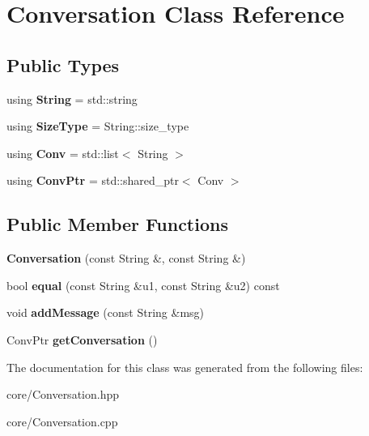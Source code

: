 \hypertarget{classConversation}{}\section{Conversation Class Reference}
\label{classConversation}
\subsection*{Public Types}
\begin{DoxyCompactItemize}
\item 
using {\bfseries String} = std\+::string\hypertarget{classConversation_a2b431b2bafb50e15aec52141053a5d2b}{}\label{classConversation_a2b431b2bafb50e15aec52141053a5d2b}

\item 
using {\bfseries Size\+Type} = String\+::size\+\_\+type\hypertarget{classConversation_a736667fdf70fd1ed56e990a53ffb2e5e}{}\label{classConversation_a736667fdf70fd1ed56e990a53ffb2e5e}

\item 
using {\bfseries Conv} = std\+::list$<$ String $>$\hypertarget{classConversation_ad0d8c118486f9b7bbd1099ededd6ea7f}{}\label{classConversation_ad0d8c118486f9b7bbd1099ededd6ea7f}

\item 
using {\bfseries Conv\+Ptr} = std\+::shared\+\_\+ptr$<$ Conv $>$\hypertarget{classConversation_a3fc3feaa732bef68eb5f504ae3b79a62}{}\label{classConversation_a3fc3feaa732bef68eb5f504ae3b79a62}

\end{DoxyCompactItemize}
\subsection*{Public Member Functions}
\begin{DoxyCompactItemize}
\item 
{\bfseries Conversation} (const String \&, const String \&)\hypertarget{classConversation_ad464ef676935998f598ac83d6dfc5259}{}\label{classConversation_ad464ef676935998f598ac83d6dfc5259}

\item 
bool {\bfseries equal} (const String \&u1, const String \&u2) const \hypertarget{classConversation_a729fc80b6ac75c1cac223a3d1a3c4743}{}\label{classConversation_a729fc80b6ac75c1cac223a3d1a3c4743}

\item 
void {\bfseries add\+Message} (const String \&msg)\hypertarget{classConversation_a5fc239d548391b6c582ac9b2d8c2893b}{}\label{classConversation_a5fc239d548391b6c582ac9b2d8c2893b}

\item 
Conv\+Ptr {\bfseries get\+Conversation} ()\hypertarget{classConversation_ac85deef748d90bb03b01ce9fcc27fced}{}\label{classConversation_ac85deef748d90bb03b01ce9fcc27fced}

\end{DoxyCompactItemize}


The documentation for this class was generated from the following files\+:\begin{DoxyCompactItemize}
\item 
core/Conversation.\+hpp\item 
core/Conversation.\+cpp\end{DoxyCompactItemize}
